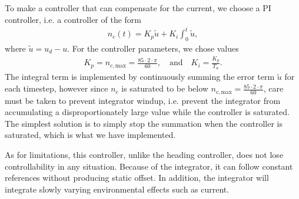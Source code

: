 \subsection{}
To make a controller that can compensate for the current, we choose a PI controller, i.e. a controller of the form
\begin{equation}\begin{aligned}
n_c(t) = K_p \tilde u + K_i \int^{t}_{0} \tilde u,
\end{aligned}\end{equation}
where $\tilde u = u_d - u$.
For the controller parameters, we chose values
\begin{equation}\begin{aligned}
K_p = n_{c, \text{max}} = \frac{85 \cdot 2 \cdot \pi}{60}, \quad \text{and} \quad K_i = \frac{K_p}{T_u}.
\end{aligned}\end{equation}
The integral term is implemented by continuously summing the error term $\tilde u$ for each timestep, however since $n_c$ is saturated to be below $n_{c, \text{max}} = \frac{85 \cdot 2 \cdot \pi}{60}$, care must be taken to prevent integrator windup, i.e. prevent the integrator from accumulating a disproportionately large value while the controller is saturated. The simplest solution is to simply stop the summation when the controller is saturated, which is what we have implemented.

As for limitations, this controller, unlike the heading controller, does not lose controllability in any situation. Because of the integrator, it can follow constant references without producing static offset. In addition, the integrator will integrate slowly varying environmental effects such as current.


